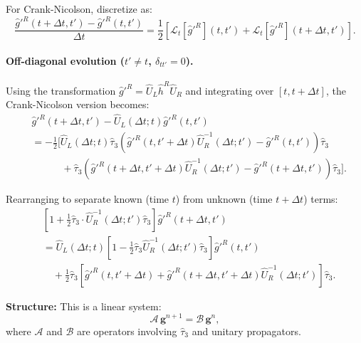 \documentclass[11pt]{article}
\begin{document}
For Crank-Nicolson, discretize as:
\begin{equation}
\frac{\hat{g}'^R(t+\Delta t, t') - \hat{g}'^R(t,t')}{\Delta t} = \frac{1}{2} \left[ \mathcal{L}_t[\hat{g}'^R](t,t') + \mathcal{L}_t[\hat{g}'^R](t+\Delta t,t') \right].
\end{equation}

\paragraph{Off-diagonal evolution ($t' \neq t$, $\delta_{tt'} = 0$).}

Using the transformation $\hat{g}'^R = \hat{U}_L \hat{h}^R \hat{U}_R$ and integrating over $[t, t+\Delta t]$, the Crank-Nicolson version becomes:
\begin{equation}
\begin{split}
&\hat{g}'^R(t+\Delta t, t') - \hat{U}_L(\Delta t; t) \hat{g}'^R(t, t') \\
&= -\frac{1}{2} \Bigg[ \hat{U}_L(\Delta t; t) \hat{\tau}_3 \left(\hat{g}'^R(t, t'+\Delta t) \hat{U}_R^{-1}(\Delta t; t') - \hat{g}'^R(t, t')\right) \hat{\tau}_3 \\
&\quad\quad\quad + \hat{\tau}_3 \left(\hat{g}'^R(t+\Delta t, t'+\Delta t) \hat{U}_R^{-1}(\Delta t; t') - \hat{g}'^R(t+\Delta t, t')\right) \hat{\tau}_3 \Bigg].
\end{split}
\end{equation}

Rearranging to separate known (time $t$) from unknown (time $t+\Delta t$) terms:
\begin{equation}
\begin{split}
&\left[1 + \frac{1}{2} \hat{\tau}_3 \cdot \hat{U}_R^{-1}(\Delta t; t') \hat{\tau}_3 \right] \hat{g}'^R(t+\Delta t, t') \\
&= \hat{U}_L(\Delta t; t) \left[1 - \frac{1}{2} \hat{\tau}_3 \hat{U}_R^{-1}(\Delta t; t') \hat{\tau}_3 \right] \hat{g}'^R(t, t') \\
&\quad + \frac{1}{2} \hat{\tau}_3 \left[\hat{g}'^R(t, t'+\Delta t) + \hat{g}'^R(t+\Delta t, t'+\Delta t) \hat{U}_R^{-1}(\Delta t; t') \right] \hat{\tau}_3.
\end{split}
\end{equation}

\textbf{Structure:} This is a linear system:
\begin{equation}
\mathcal{A} \, \mathbf{g}^{n+1} = \mathcal{B} \, \mathbf{g}^n,
\end{equation}
where $\mathcal{A}$ and $\mathcal{B}$ are operators involving $\hat{\tau}_3$ and unitary propagators.
\end{document}
